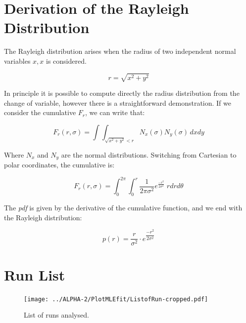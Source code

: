 \documentclass[11pt,a4paper,oneside]{article}
\begin{document}
\appendix
\section{Derivation of the Rayleigh Distribution}
\label{sec:Rayleigh}

The Rayleigh distribution arises when the radius of two independent normal variables $x,x$ is considered.

\begin{equation*}
r = \sqrt{x^{2} + y^{2}}
\end{equation*} 


In principle it is possible to compute directly the radius distribution from the change of variable, however there is a straightforward demonstration. If we consider the cumulative $F_{r}$, we can write that:

\begin{equation*}
F_{r}(r, \sigma) = \int \int_{ \sqrt{x^{2} + y^{2}} < r} N_{x}(\sigma) N_{y}(\sigma) \, dx dy
\end{equation*}

Where $N_{x}$ and $N_{y}$ are the normal distributions. Switching from Cartesian to polar coordinates, the cumulative is:

\begin{equation*}
F_{r}(r, \sigma) =  \int_{0}^{2 \pi} \int_{0}^{r} \frac{1}{2 \pi \sigma^{2}}  e^{ \frac{- r^{2}}{2 \sigma^{2}}} \; r  dr d\theta
\end{equation*}


The \textit{pdf} is given by the derivative of the cumulative function, and we end with the Rayleigh distribution:


\begin{equation}
p(r) = \frac{r}{\sigma^{2}} \cdot  e^{ \dfrac{- r^{2}}{ 2 \sigma^{2}}}
\end{equation}


\section{Run List}
\label{fig:RunList}

\begin{figure}[hbtp]
\centering
\texttt{[image: ../ALPHA-2/PlotMLEfit/ListofRun-cropped.pdf]}
\caption{List of runs analysed.}
\end{figure}
\end{document}
